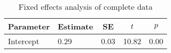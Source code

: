 \begin{table}[ht]
\centering
\caption{Fixed effects analysis of complete data} 
\label{tab:FE}
\begingroup\small
\begin{tabular}{llccc}
  \hline
Parameter & Estimate & SE & $t$ & $p$ \\ 
  \hline
Intercept & 0.29 & 0.03 & 10.82 & 0.00 \\ 
   \hline
\end{tabular}
\endgroup
\end{table}
